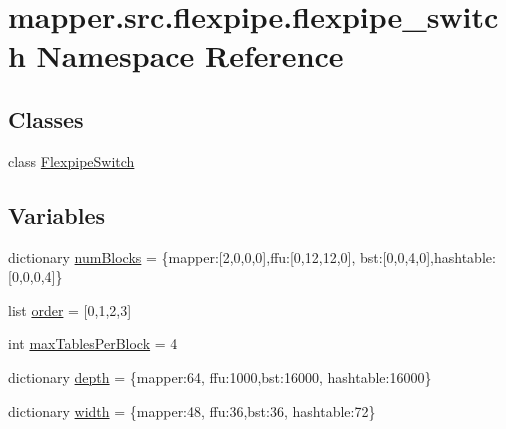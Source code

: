 \hypertarget{namespacemapper_1_1src_1_1flexpipe_1_1flexpipe__switch}{}\section{mapper.\+src.\+flexpipe.\+flexpipe\+\_\+switch Namespace Reference}
\label{namespacemapper_1_1src_1_1flexpipe_1_1flexpipe__switch}
\subsection*{Classes}
\begin{DoxyCompactItemize}
\item 
class \hyperlink{classmapper_1_1src_1_1flexpipe_1_1flexpipe__switch_1_1_flexpipe_switch}{Flexpipe\+Switch}
\end{DoxyCompactItemize}
\subsection*{Variables}
\begin{DoxyCompactItemize}
\item 
dictionary \hyperlink{namespacemapper_1_1src_1_1flexpipe_1_1flexpipe__switch_a06dd0e0cc250f21126ad65e3d415e620}{num\+Blocks} = \{\textquotesingle{}mapper\textquotesingle{}\+:\mbox{[}2,0,0,0\mbox{]},\textquotesingle{}ffu\textquotesingle{}\+:\mbox{[}0,12,12,0\mbox{]}, \textquotesingle{}bst\textquotesingle{}\+:\mbox{[}0,0,4,0\mbox{]},\textquotesingle{}hashtable\textquotesingle{}\+:\mbox{[}0,0,0,4\mbox{]}\}
\item 
list \hyperlink{namespacemapper_1_1src_1_1flexpipe_1_1flexpipe__switch_abee9e96be5924f0094a7173aac274d89}{order} = \mbox{[}0,1,2,3\mbox{]}
\item 
int \hyperlink{namespacemapper_1_1src_1_1flexpipe_1_1flexpipe__switch_afb3a1e89a3f957afea5d60fb9341b071}{max\+Tables\+Per\+Block} = 4
\item 
dictionary \hyperlink{namespacemapper_1_1src_1_1flexpipe_1_1flexpipe__switch_af2b4b608a1330bbc1e76ada76bccb120}{depth} = \{\textquotesingle{}mapper\textquotesingle{}\+:64, \textquotesingle{}ffu\textquotesingle{}\+:1000,\textquotesingle{}bst\textquotesingle{}\+:16000, \textquotesingle{}hashtable\textquotesingle{}\+:16000\}
\item 
dictionary \hyperlink{namespacemapper_1_1src_1_1flexpipe_1_1flexpipe__switch_a5be9af3f83731b2768fff9dc48fc511f}{width} = \{\textquotesingle{}mapper\textquotesingle{}\+:48, \textquotesingle{}ffu\textquotesingle{}\+:36,\textquotesingle{}bst\textquotesingle{}\+:36, \textquotesingle{}hashtable\textquotesingle{}\+:72\}
\end{DoxyCompactItemize}


